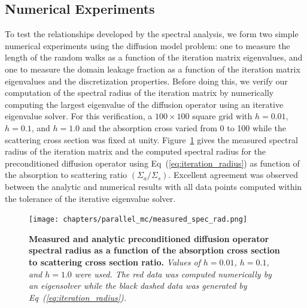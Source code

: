 \subsection{Numerical Experiments }
\label{subsec:numerical_experiments}
To test the relationships developed by the spectral analysis, we form
two simple numerical experiments using the diffusion model problem:
one to measure the length of the random walks as a function of the
iteration matrix eigenvalues, and one to measure the domain leakage
fraction as a function of the iteration matrix eigenvalues and the
discretization properties. Before doing this, we verify our
computation of the spectral radius of the iteration matrix by
numerically computing the largest eigenvalue of the diffusion operator
using an iterative eigenvalue solver. For this verification, a $100
\times 100$ square grid with $h=0.01$, $h=0.1$, and $h=1.0$ and the
absorption cross varied from 0 to 100 while the scattering cross
section was fixed at unity. Figure~\ref{fig:measured_spec_rad} gives
the measured spectral radius of the iteration matrix and the computed
spectral radius for the preconditioned diffusion operator using
Eq~(\ref{eq:iteration_radius}) as function of the absorption to
scattering ratio $(\Sigma_a / \Sigma_s)$. Excellent agreement was
observed between the analytic and numerical results with all data
points computed within the tolerance of the iterative eigenvalue
solver.
\begin{figure}[t!]
  \begin{spacing}{1.0}
    \begin{center}
      \texttt{[image: chapters/parallel\_mc/measured\_spec\_rad.png]}
    \end{center}
    \caption{\textbf{Measured and analytic preconditioned diffusion
        operator spectral radius as a function of the absorption cross
        section to scattering cross section ratio.} \textit{Values of
        $h=0.01$, $h=0.1$, and $h=1.0$ were used. The red data was
        computed numerically by an eigensolver while the black dashed
        data was generated by Eq~(\ref{eq:iteration_radius}).}}
    \label{fig:measured_spec_rad}
  \end{spacing}
\end{figure}


